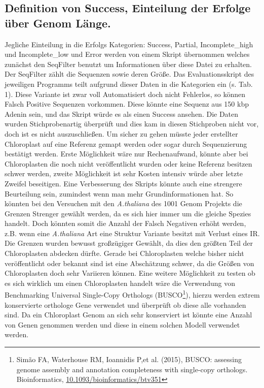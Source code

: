 \documentclass{scrartcl}
\begin{document}
\subsection{Definition von Success, Einteilung der Erfolge über Genom Länge.}
\label{sec-5-1}
Jegliche Einteilung in die Erfolgs Kategorien: Success, Partial, Incomplete\_high und Incomplete\_low und Error werden von einem Skript übernommen welches zunächst den SeqFilter benutzt um Informationen über diese Datei zu erhalten. 
Der SeqFilter zählt die Sequenzen sowie deren Größe. Das Evaluationsskript des jeweiligen Programms teilt aufgrund dieser Daten in die Kategorien ein (s. Tab. 1). Diese Variante ist zwar voll Automatisiert
doch nicht Fehlerlos, so können Falsch Positive Sequenzen vorkommen. Diese könnte eine Sequenz aus 150 kbp Adenin sein, und das Skript würde es als einen Success ansehen. Die Daten wurden Stichprobenartig überprüft und dies 
kam in diesen Stichproben nicht vor, doch ist es nicht auszuschließen. Um sicher zu gehen müsste jeder erstellter Chloroplast auf eine Referenz gemapt werden oder sogar durch Sequenzierung bestätigt werden. Erste Möglichkeit
wäre nur Rechenaufwand, könnte aber bei Chloroplasten die noch nicht veröffentlicht wurden oder keine Referenz besitzen schwer werden, zweite Möglichkeit ist sehr Kosten intensiv würde aber letzte Zweifel beseitigen. 
Eine Verbesserung des Skripts könnte auch eine strengere Beurteilung sein, zumindest wenn man mehr Grundinformationen hat. So könnten bei den Versuchen mit den \emph{A.thaliana} des 1001 Genom Projekts die Grenzen Strenger gewählt werden, 
da es sich hier immer um die gleiche Spezies handelt. Doch könnten somit die Anzahl der Falsch Negativen erhöht werden, z.B. wenn eine \emph{A.thaliana} Art eine Struktur Variante besitzt mit Verlust eines IR. Die Grenzen wurden 
bewusst großzügiger Gewählt, da dies den größten Teil der Chloroplasten abdecken dürfte. Gerade bei Chloroplasten welche bisher nicht veröffentlicht oder bekannt sind ist eine Abschätzung schwer, da die Größen von Chloroplasten
doch sehr Variieren können. Eine weitere Möglichkeit zu testen ob es sich wirklich um einen Chloroplasten handelt wäre die Verwendung von Benchmarking Universal Single-Copy Orthologs (BUSCO\footnote{Simão FA, Waterhouse RM, Ioannidis P,et al. (2015), BUSCO: assessing genome assembly and annotation completeness with single-copy orthologs.  Bioinformatics, \url{10.1093/bioinformatics/btv351}}), hierzu werden extrem konservierte
orthologe Gene verwendet und überprüft ob diese alle vorhanden sind. Da ein Chloroplast Genom an sich sehr konserviert ist könnte eine Anzahl von Genen genommen werden und diese in einem solchen Modell verwendet werden. 
\end{document}
